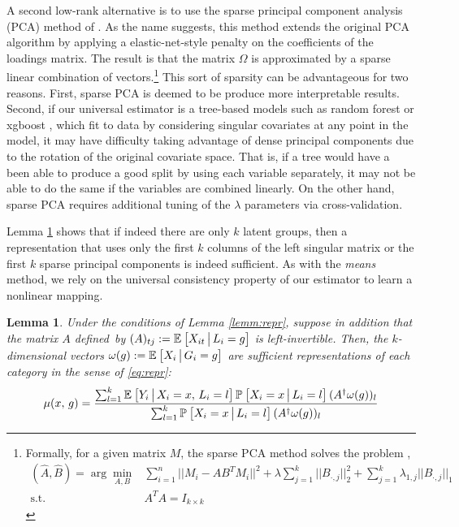 \documentclass{article}
\theoremstyle{plain}
\newtheorem{lemm}[prop]{Lemma}
\theoremstyle{definition}
\theoremstyle{remark}
\begin{document}
A second low-rank alternative is to use the sparse principal component analysis (PCA) method of \cite{zou2006sparse}. As the name suggests, this method extends the original PCA algorithm by applying a elastic-net-style penalty on the coefficients of the loadings matrix. The result is that the matrix $\Omega$ is approximated by a sparse linear combination of vectors.\footnote{Formally, for a given matrix $M$, the sparse PCA method solves the problem \citep[~eq. 3.12]{zou2006sparse},
\begin{align}
    (\hat{A},\hat{B}) = \arg\min_{A,B} &\sum_{i=1}^n ||M_i - AB^TM_i||^2+ \lambda \sum_{j=1}^k ||B_{\cdot,j} ||_{2}^2 + \sum_{j=1}^k \lambda_{1,j} ||B_{\cdot,j}||_1\\
    \text{s.t.} \quad & A^TA = I_{k \times k}
    \label{eq:sparse_pca}
\end{align}
} This sort of sparsity can be advantageous for two reasons. First, sparse PCA is deemed to be produce more interpretable results. Second, if our universal estimator is a tree-based models such as random forest \cite{breiman2001random} or xgboost \cite{chen2016xgboost}, which fit to data by considering singular covariates at any point in the model, it may have difficulty taking advantage of dense principal components due to the rotation of the original covariate space. That is, if a tree would have a been able to produce a good split by using each variable separately, it may not be able to do the same if the variables are combined linearly. On the other hand, sparse PCA requires additional tuning of the $\lambda$ parameters via cross-validation.

Lemma \ref{lemm:lowrank} shows that if indeed there are only $k$ latent groups, then a representation that uses only the first $k$ columns of the left singular matrix or the first $k$ sparse principal components is indeed sufficient. As with the \emph{means} method, we rely on the universal consistency property of our estimator to learn a nonlinear mapping.

\begin{lemm}
\label{lemm:lowrank}
Under the conditions of Lemma \ref{lemm:repr}, suppose in addition that the matrix $A$ defined~by $(A)_{tj} := \mathbb{E}_{}\left[X_{it} \,\big|\, L_{i} = g\right]$
is left-invertible. Then, the $k$-dimensional vectors $\omega(g) := \mathbb{E}_{}\left[X_{i} \,\big|\, G_i = g\right]$ are sufficient representations of each category in the sense of \eqref{eq:repr}:
\begin{equation}
\label{eq:lowrank}
\mu(x, \, g) = \frac{\sum_{l = 1}^k  \mathbb{E}_{}\left[Y_i \,\big|\, X_i = x, \, L_i = l\right] \mathbb{P}_{}\left[X_i = x \,\big|\, L_i = l\right] (A^\dagger \omega(g))_l}{\sum_{l = 1}^k \mathbb{P}_{}\left[X_i = x \,\big|\, L_i = l\right] (A^\dagger \omega(g))_l}
\end{equation}
\end{lemm}
\end{document}
